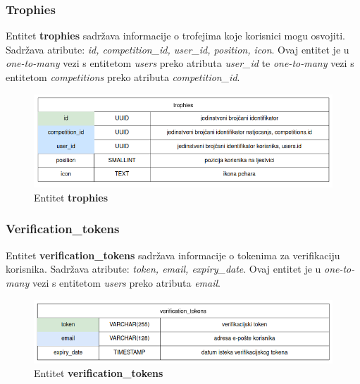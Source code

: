 		\eject
		
		\subsubsection*{Trophies}
		
		Entitet \textbf{trophies} sadržava informacije o trofejima koje korisnici mogu osvojiti. Sadržava atribute: \textit{id, competition\_id, user\_id, position, icon}. Ovaj entitet je u \textit{one-to-many} vezi s entitetom \textit{users} preko atributa \textit{user\_id} te \textit{one-to-many} vezi s entitetom \textit{competitions} preko atributa \textit{competition\_id}.
		
		\begin{figure}[htbp]
			\centering
			\includegraphics[width=\linewidth]{slike/trophies_tablica.png}
			\caption{Entitet \textbf{trophies}}
		\end{figure}
		
		\subsubsection*{Verification\_tokens}
		
		Entitet \textbf{verification\_tokens} sadržava informacije o tokenima za verifikaciju korisnika. Sadržava atribute: \textit{token, email, expiry\_date}. Ovaj entitet je u \textit{one-to-many} vezi s entitetom \textit{users} preko atributa \textit{email}.
		
		\begin{figure}[htbp]
			\centering
			\includegraphics[width=\linewidth]{slike/verification_tokens_tablica.png}
			\caption{Entitet \textbf{verification\_tokens}}
		\end{figure}
		
		\eject
		
